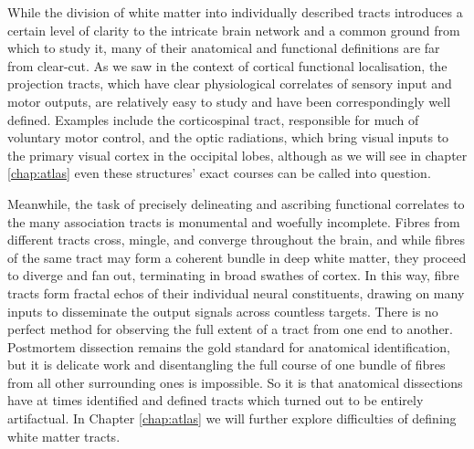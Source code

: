 While the division of white matter into individually described tracts introduces a certain level of clarity to the intricate brain network and a common ground from which to study it, many of their anatomical and functional definitions are far from clear-cut.
As we saw in the context of cortical functional localisation, the projection tracts, which have clear physiological correlates of sensory input and motor outputs, are relatively easy to study and have been correspondingly well defined.
Examples include the corticospinal tract, responsible for much of voluntary motor control, and the optic radiations, which bring visual inputs to the primary visual cortex in the occipital lobes, although as we will see in chapter \ref{chap:atlas} even these structures' exact courses can be called into question.

Meanwhile, the task of precisely delineating and ascribing functional correlates to the many association tracts is monumental and woefully incomplete.
Fibres from different tracts cross, mingle, and converge throughout the brain, and while fibres of the same tract may form a coherent bundle in deep white matter, they proceed to diverge and fan out, terminating in broad swathes of cortex.
In this way, fibre tracts form fractal echos of their individual neural constituents, drawing on many inputs to disseminate the output signals across countless targets.
There is no perfect method for observing the full extent of a tract from one end to another.
Postmortem dissection remains the gold standard for anatomical identification, but it is delicate work and disentangling the full course of one bundle of fibres from all other surrounding ones is impossible.
So it is that anatomical dissections have at times identified and defined tracts which turned out to be entirely artifactual.
In Chapter \ref{chap:atlas} we will further explore difficulties of defining white matter tracts.

